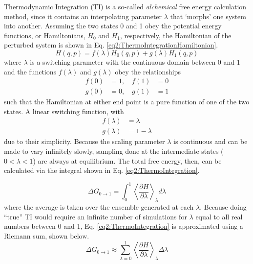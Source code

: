 Thermodynamic Integration (TI) is a so-called \emph{alchemical} free energy
calculation method, since it contains an interpolating parameter $\lambda$ that
`morphs' one system into another. \cite{Leach_Book_MolModel_2001,
Tuckerman_Book_StatMech_TheoryAndSim} Assuming the two states 0 and 1 obey the
potential energy functions, or Hamiltonians, $H_0$ and $H_1$, respectively, the
Hamiltonian of the perturbed system is shown in Eq.
\ref{eq2:ThermoIntegrationHamiltonian}.
\begin{equation}
   H(q,p) = f(\lambda) H_0(q,p) + g(\lambda) H_1(q,p)
   \label{eq2:ThermoIntegrationHamiltonian}
\end{equation}
where $\lambda$ is a switching parameter with the continuous domain between 0
and 1 and the functions $f(\lambda)$ and $g(\lambda)$ obey the relationships
\begin{eqnarray*}
   f(0) & = 1,\quad f(1) & = 0 \\
   g(0) & = 0,\quad g(1) & = 1
\end{eqnarray*}
such that the Hamiltonian at either end point is a pure function of one of the
two states. A linear switching function, with
\begin{eqnarray*}
   f(\lambda) & = \lambda \\
   g(\lambda) & = 1 - \lambda
\end{eqnarray*}
due to their simplicity. Because the scaling parameter $\lambda$ is continuous
and can be made to vary infinitely slowly, sampling done at the intermediate
states (\ie $0 < \lambda < 1$) are always at equilibrium. The total free energy,
then, can be calculated via the integral shown in Eq.
\ref{eq2:ThermoIntegration}. \cite{Leach_Book_MolModel_2001}

\begin{equation}
   \Delta G_{0 \rightarrow 1} = \int _ 0 ^ 1 \left \langle \frac {\partial H}
         {\partial \lambda} \right \rangle _ {\lambda} d\lambda
   \label{eq2:ThermoIntegration}
\end{equation}
where the average is taken over the ensemble generated at each $\lambda$.
Because doing ``true'' TI would require an infinite number of simulations for
$\lambda$ equal to all real numbers between 0 and 1, Eq.
\ref{eq2:ThermoIntegration} is approximated using a Riemann sum, shown below.
\begin{equation*}
   \Delta G_{0 \rightarrow 1} \approx \sum _ {\lambda = 0} ^ 1 \left \langle
         \frac {\partial H} {\partial \lambda} \right \rangle _ {\lambda} \Delta
         \lambda
\end{equation*}

